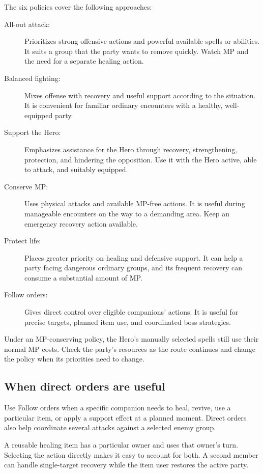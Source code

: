 The six policies cover the following approaches:
\begin{description}
  \item[All-out attack:] Prioritizes strong offensive actions and powerful
    available spells or abilities. It suits a group that the party wants
    to remove quickly. Watch MP and the need for a separate healing action.
  \item[Balanced fighting:] Mixes offense with recovery and useful support
    according to the situation. It is convenient for familiar ordinary
    encounters with a healthy, well-equipped party.
  \item[Support the Hero:] Emphasizes assistance for the Hero through
    recovery, strengthening, protection, and hindering the opposition.
    Use it with the Hero active, able to attack, and suitably equipped.
  \item[Conserve MP:] Uses physical attacks and available MP-free actions.
    It is useful during manageable encounters on the way to a demanding
    area. Keep an emergency recovery action available.
  \item[Protect life:] Places greater priority on healing and defensive
    support. It can help a party facing dangerous ordinary groups, and
    its frequent recovery can consume a substantial amount of MP.
  \item[Follow orders:] Gives direct control over eligible companions'
    actions. It is useful for precise targets, planned item use, and
    coordinated boss strategies.
\end{description}

Under an MP-conserving policy, the Hero's manually selected spells still
use their normal MP costs. Check the party's resources as the route
continues and change the policy when its priorities need to change.

\subsection*{When direct orders are useful}

Use Follow orders when a specific companion needs to heal, revive, use
a particular item, or apply a support effect at a planned moment. Direct
orders also help coordinate several attacks against a selected enemy group.

A reusable healing item has a particular owner and uses that owner's turn.
Selecting the action directly makes it easy to account for both. A second
member can handle single-target recovery while the item user restores the
active party.

